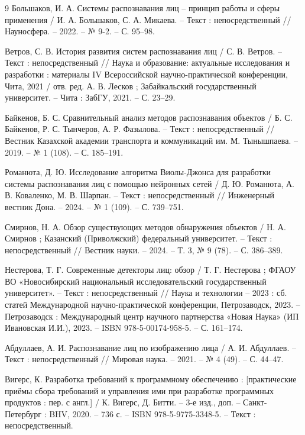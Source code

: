 
\begin{thebibliography}{9}
     Большаков, И. А. Системы распознавания лиц – принцип работы и сферы применения / И. А. Большаков, С. А. Микаева. – Текст : непосредственный // Науносфера. – 2022. – № 9-2. – С. 95–98.
    
     Ветров, С. В. История развития систем распознавания лиц / С. В. Ветров. – Текст : непосредственный // Наука и образование: актуальные исследования и разработки : материалы IV Всероссийской научно-практической конференции, Чита, 2021 / отв. ред. А. В. Лесков ; Забайкальский государственный университет. – Чита : ЗабГУ, 2021. – С. 23–29.
    
     Байкенов, Б. С. Сравнительный анализ методов распознавания объектов / Б. С. Байкенов, Р. С. Тынчеров, А. Р. Фазылова. – Текст : непосредственный // Вестник Казахской академии транспорта и коммуникаций им. М. Тынышпаева. – 2019. – № 1 (108). – С. 185–191.
    
     Романюта, Д. Ю. Исследование алгоритма Виолы-Джонса для разработки системы распознавания лиц с помощью нейронных сетей / Д. Ю. Романюта, А. В. Коваленко, М. В. Шарпан. – Текст : непосредственный // Инженерный вестник Дона. – 2024. – № 1 (109). – С. 739–751.
    
     Смирнов, Н. А. Обзор существующих методов обнаружения объектов / Н. А. Смирнов ; Казанский (Приволжский) федеральный университет. – Текст : непосредственный // Вестник науки. – 2024. – Т. 3, № 9 (78). – С. 386–389.
    
     Нестерова, Т. Г. Современные детекторы лиц: обзор / Т. Г. Нестерова ; ФГАОУ ВО «Новосибирский национальный исследовательский государственный университет». – Текст : непосредственный // Наука и технологии – 2023 : сб. статей Международной научно-практической конференции, Петрозаводск, 2023. – Петрозаводск : Международный центр научного партнерства «Новая Наука» (ИП Ивановская И.И.), 2023. – ISBN 978-5-00174-958-5. – С. 161–174.
    
     Абдуллаев, А. И. Распознавание лиц по изображению лица / А. И. Абдуллаев. – Текст : непосредственный // Мировая наука. – 2021. – № 4 (49). – С. 44–47.
    
     Вигерс, К. Разработка требований к программному обеспечению : [практические приёмы сбора требований и управления ими при разработке программных продуктов : пер. с англ.] / К. Вигерс, Д. Битти. – 3-е изд., доп. – Санкт-Петербург : BHV, 2020. – 736 с. – ISBN 978-5-9775-3348-5. – Текст : непосредственный. 
    

\end{thebibliography}
